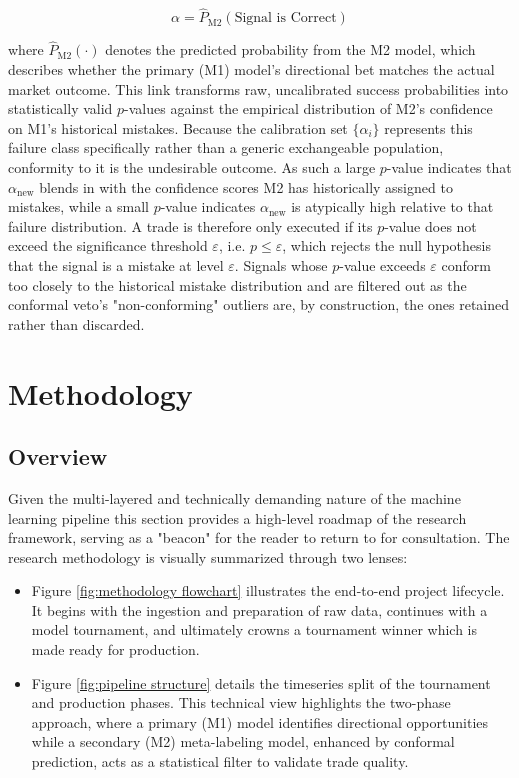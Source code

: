 \documentclass[12pt, a4paper]{article}
\begin{document}
\begin{equation}
\alpha = \hat{P}_{\text{M2}}(\text{Signal is Correct})
\label{eq:nonconformity}
\end{equation}

where \( \hat{P}_{\text{M2}}(\cdot) \) denotes the predicted probability from the M2 model, 
which describes whether the primary (M1) model's directional bet matches the actual market outcome.
This link transforms raw, uncalibrated success probabilities into statistically valid $p$-values against the empirical distribution of M2's confidence on M1's historical 
mistakes. Because the calibration set $\{\alpha_i\}$ represents this failure class specifically rather than a generic exchangeable population, conformity to it is the 
undesirable outcome. As such a large $p$-value indicates that $\alpha_{\text{new}}$ blends in with the confidence scores M2 has historically assigned to mistakes, while a small 
$p$-value indicates $\alpha_{\text{new}}$ is atypically high relative to that failure distribution. A trade is therefore only executed if its $p$-value does not exceed 
the significance threshold $\varepsilon$, i.e. $p \leq \varepsilon$, which rejects the null hypothesis that the signal is a mistake at level $\varepsilon$. Signals whose 
$p$-value exceeds $\varepsilon$ conform too closely to the historical mistake distribution and are filtered out as the conformal veto's "non-conforming" outliers are, 
by construction, the ones retained rather than discarded.


\newpage

\section{Methodology}

\subsection{Overview}

Given the multi-layered and technically demanding nature of the machine learning pipeline this section provides a high-level roadmap 
of the research framework, serving as a "beacon" for the reader to return to for consultation. 
The research methodology is visually summarized through two lenses:

\begin{itemize}
    \item Figure \ref{fig:methodology flowchart} illustrates the end-to-end project lifecycle. 
    It begins with the ingestion and preparation of raw data, continues with a model tournament, 
    and ultimately crowns a tournament winner which is made ready for production.

    \item Figure \ref{fig:pipeline structure} details the timeseries split of the tournament and production phases. 
    This technical view highlights the two-phase approach, where a primary (M1) model identifies directional opportunities while a secondary (M2) 
    meta-labeling model, enhanced by conformal prediction, acts as a statistical filter to validate trade quality.
\end{itemize}
\end{document}
